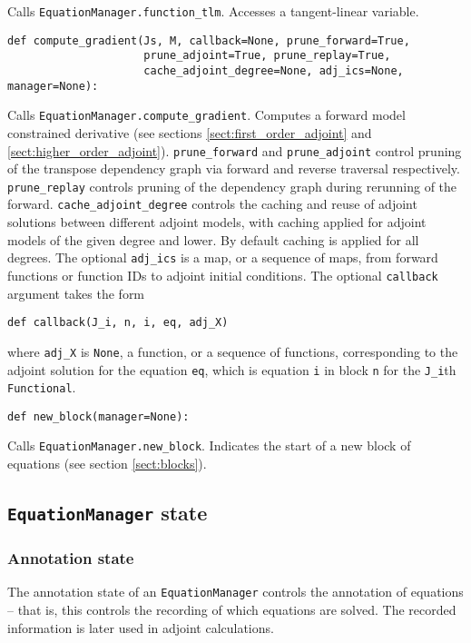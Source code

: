 \documentclass[11pt]{article}
\begin{document}
Calls \texttt{EquationManager.function\_tlm}. Accesses a tangent-linear
variable.
\begin{lstlisting}
def compute_gradient(Js, M, callback=None, prune_forward=True,
                     prune_adjoint=True, prune_replay=True,
                     cache_adjoint_degree=None, adj_ics=None, manager=None):
\end{lstlisting}
Calls \texttt{EquationManager.compute\_gradient}. Computes a forward model
constrained derivative (see sections \ref{sect:first_order_adjoint} and
\ref{sect:higher_order_adjoint}). \texttt{prune\_forward} and
\texttt{prune\_adjoint} control pruning of the transpose dependency graph via
forward and reverse traversal respectively. \texttt{prune\_replay} controls
pruning of the dependency graph during rerunning of the forward.
\texttt{cache\_adjoint\_degree} controls the caching and reuse of adjoint
solutions between different adjoint models, with caching applied for adjoint
models of the given degree and lower. By default caching is applied for all
degrees. The optional \texttt{adj\_ics} is a map, or a sequence of maps, from
forward functions or function IDs to adjoint initial conditions. The optional
\texttt{callback} argument takes the form
\begin{lstlisting}
def callback(J_i, n, i, eq, adj_X)
\end{lstlisting}
where \texttt{adj\_X} is \texttt{None}, a function, or a sequence of functions,
corresponding to the adjoint solution for the equation \texttt{eq}, which is
equation \texttt{i} in block \texttt{n} for the \texttt{J\_i}th
\texttt{Functional}.
\begin{lstlisting}
def new_block(manager=None):
\end{lstlisting}
Calls \texttt{EquationManager.new\_block}. Indicates the start of a new block
of equations (see section \ref{sect:blocks}).

\subsection{\texttt{EquationManager} state}\label{sect:EquationManager_state}

\subsubsection{Annotation state}

The annotation state of an \texttt{EquationManager} controls the annotation of
equations -- that is, this controls the recording of which equations are
solved. The recorded information is later used in adjoint calculations.
\end{document}
